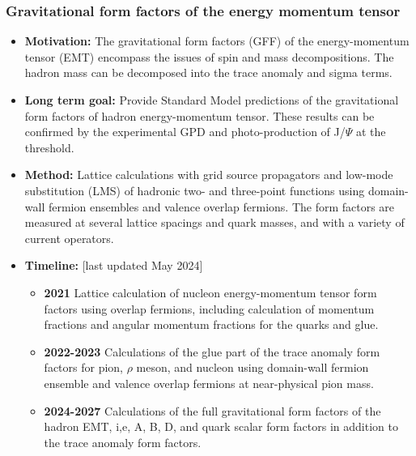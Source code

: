 \documentclass[12pt,hyperpdf]{article}
\begin{document}
\subsubsection{Gravitational form factors of the energy momentum tensor}
\begin{itemize}
    \item{\bf Motivation:} The gravitational form factors (GFF) of the energy-momentum tensor (EMT) encompass the issues of spin and mass decompositions. The hadron mass can be decomposed into the trace anomaly and sigma terms.
    \item{\bf Long term goal:} Provide Standard Model predictions of the gravitational form factors of hadron energy-momentum tensor. These results can be confirmed by the experimental GPD and photo-production of J/$\Psi$ at the threshold.
    \item{\bf Method:} Lattice calculations with grid source propagators and low-mode substitution (LMS) of hadronic two- and three-point functions using domain-wall fermion ensembles and valence overlap fermions. The form factors are measured at several lattice spacings and quark masses, and with a variety of current operators.
\item{\bf Timeline:} \hfill [last updated May 2024]
\begin{itemize}
    \item{\bf 2021} Lattice calculation of nucleon energy-momentum tensor form factors using overlap fermions, including calculation of momentum fractions and angular momentum fractions for the quarks and glue.
    \item{\bf 2022-2023} Calculations of the glue part of the trace anomaly form factors for pion, $\rho$ meson, and nucleon using domain-wall fermion ensemble and valence overlap fermions at near-physical pion mass.
    \item{\bf 2024-2027} Calculations of the full gravitational form factors of the hadron EMT, i,e, A, B, D, and quark scalar form factors in addition to the trace anomaly form factors. 
\end{itemize}
\end{itemize}


\end{document}
